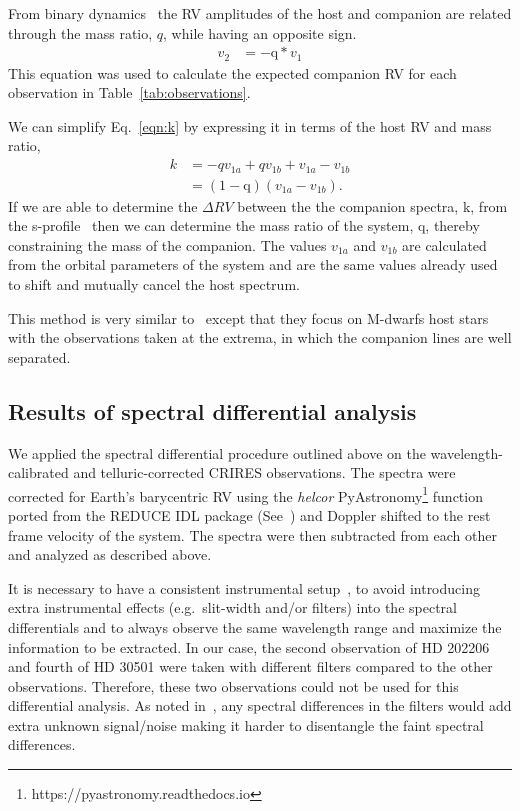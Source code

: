 \documentclass[fleqn,usenatbib]{mnras}
\begin{document}
    From binary dynamics~\citep[e.g.][]{murray_keplerian_2010} the RV amplitudes of the host and companion are related through the mass ratio, \(q \), while having an opposite sign.
    \begin{align}
    v_{2}  &= -\textrm{q} * v_{1} \label{eqn:q_relation}
    \end{align}
    This equation was used to calculate the expected companion RV for each observation in Table~\ref{tab:observations}. 
    
    We can simplify Eq.~\ref{eqn:k} by expressing it in terms of the host RV and mass ratio,
    \begin{align}
    k &= -q v_{1a} + q v_{1b} + v_{1a} - v_{1b} \nonumber \\
    &= (1 - \textrm{q})(v_{1a} - v_{1b}). \label{eqn:k_simplified}
    \end{align}
    If we are able to determine the \(\Delta RV \) between the the companion spectra, k, from the s-profile~\citep[see ][]{ferluga_separating_1997} then we can determine the mass ratio of the system, q, thereby constraining the mass of the companion. The values \(v_{1a} \) and \(v_{1b} \) are calculated from the orbital parameters of the system and are the same values already used to shift and mutually cancel the host spectrum.
    
    This method is very similar to~\citet{kostogryz_spectral_2013} except that they focus on M-dwarfs host stars with the observations taken at the extrema, in which the companion lines are well separated.
    
    
    \subsection{Results of spectral differential analysis}
    
    \label{appendix:A2}
    We applied the spectral differential procedure outlined above on the wavelength-calibrated and telluric-corrected CRIRES observations. The spectra were corrected for Earth's barycentric RV using the \emph{helcor} PyAstronomy\footnote{https://pyastronomy.readthedocs.io} function ported from the REDUCE IDL package (See~\citet[][]{piskunov_new_2002}) and Doppler shifted to the rest frame velocity of the system. The spectra were then subtracted from each other and analyzed as described above.
    
    It is necessary to have a consistent instrumental setup~\citet{ferluga_separating_1997}, to avoid introducing extra instrumental effects (e.g.\ slit-width and/or filters) into the spectral differentials and to always observe the same wavelength range and maximize the information to be extracted. In our case, the second observation of {HD 202206} and fourth of {HD 30501} were taken with different filters compared to the other observations. Therefore, these two observations could not be used for this differential analysis. As noted in~\citep{hadrava_disentangling_2009}, any spectral differences in the filters would add extra unknown signal/noise making it harder to disentangle the faint spectral differences.
    
\end{document}
